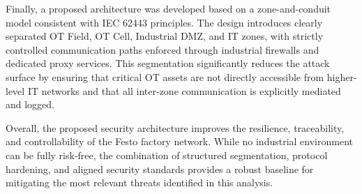 Finally, a proposed architecture was developed based on a zone-and-conduit model consistent with IEC 62443 principles. The design introduces clearly separated OT Field, OT Cell, Industrial DMZ, and IT zones, with strictly controlled communication paths enforced through industrial firewalls and dedicated proxy services. This segmentation significantly reduces the attack surface by ensuring that critical OT assets are not directly accessible from higher-level IT networks and that all inter-zone communication is explicitly mediated and logged.

Overall, the proposed security architecture improves the resilience, traceability, and controllability of the Festo factory network. While no industrial environment can be fully risk-free, the combination of structured segmentation, protocol hardening, and aligned security standards provides a robust baseline for mitigating the most relevant threats identified in this analysis.